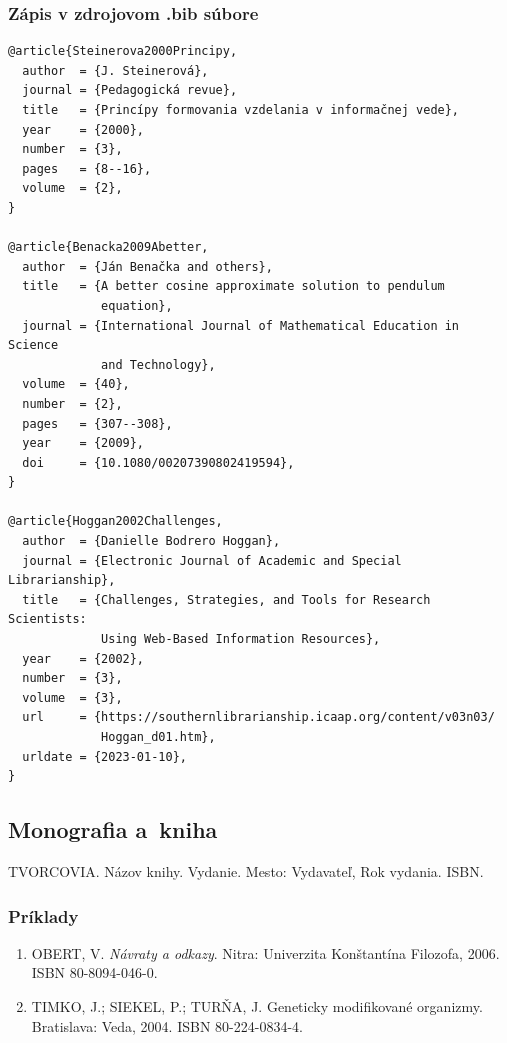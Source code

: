 \subsubsection*{\normalsize Zápis v zdrojovom .bib súbore}
\begin{verbatim}
@article{Steinerova2000Principy,
  author  = {J. Steinerová},
  journal = {Pedagogická revue},
  title   = {Princípy formovania vzdelania v informačnej vede},
  year    = {2000},
  number  = {3},
  pages   = {8--16},
  volume  = {2},
}

@article{Benacka2009Abetter,
  author  = {Ján Benačka and others},
  title   = {A better cosine approximate solution to pendulum
             equation},
  journal = {International Journal of Mathematical Education in Science
             and Technology},
  volume  = {40},
  number  = {2},
  pages   = {307--308},
  year    = {2009},
  doi     = {10.1080/00207390802419594},
}

@article{Hoggan2002Challenges,
  author  = {Danielle Bodrero Hoggan},
  journal = {Electronic Journal of Academic and Special Librarianship},
  title   = {Challenges, Strategies, and Tools for Research Scientists:
             Using Web-Based Information Resources},
  year    = {2002},
  number  = {3},
  volume  = {3},
  url     = {https://southernlibrarianship.icaap.org/content/v03n03/
             Hoggan_d01.htm},
  urldate = {2023-01-10},
}
\end{verbatim}

\subsection{Monografia a~kniha}
\begin{trivlist}
\item TVORCOVIA. Názov knihy. Vydanie. Mesto: Vydavateľ, Rok vydania. ISBN.
\end{trivlist}

\subsubsection*{\normalsize Príklady}
\begin{enumerate}
\item OBERT, V. \textit{Návraty a odkazy}. Nitra: Univerzita Konštantína Filozofa, 2006. ISBN 80-8094-046-0.

\item TIMKO, J.; SIEKEL, P.; TURŇA, J. Geneticky modifikované organizmy. Bratislava: Veda, 2004. ISBN 80-224-0834-4.
\end{enumerate}

